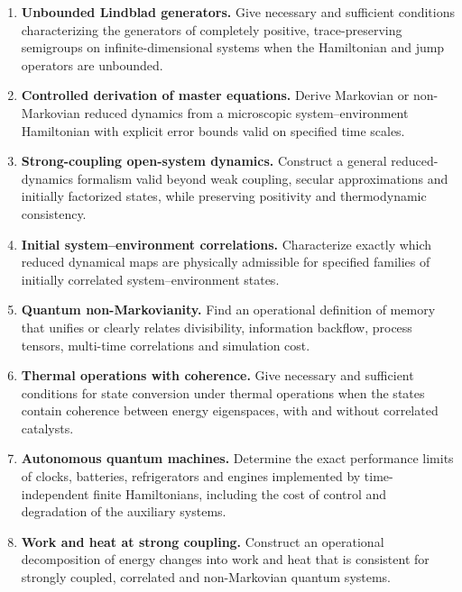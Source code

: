 \documentclass{article}
\begin{document}
\begin{enumerate}[label=\textbf{O\arabic*.},leftmargin=*]

\item \precise{} \textbf{Unbounded Lindblad generators.}
Give necessary and sufficient conditions characterizing the
generators of completely positive, trace-preserving semigroups on
infinite-dimensional systems when the Hamiltonian and jump operators
are unbounded.

\item \precise{} \textbf{Controlled derivation of master equations.}
Derive Markovian or non-Markovian reduced dynamics from a microscopic
system--environment Hamiltonian with explicit error bounds valid on
specified time scales.

\item \formalism{} \textbf{Strong-coupling open-system dynamics.}
Construct a general reduced-dynamics formalism valid beyond weak
coupling, secular approximations and initially factorized states,
while preserving positivity and thermodynamic consistency.

\item \precise{} \textbf{Initial system--environment correlations.}
Characterize exactly which reduced dynamical maps are physically
admissible for specified families of initially correlated
system--environment states.

\item \formalism{} \textbf{Quantum non-Markovianity.}
Find an operational definition of memory that unifies or clearly
relates divisibility, information backflow, process tensors,
multi-time correlations and simulation cost.

\item \precise{} \textbf{Thermal operations with coherence.}
Give necessary and sufficient conditions for state conversion under
thermal operations when the states contain coherence between energy
eigenspaces, with and without correlated catalysts.

\item \precise{} \textbf{Autonomous quantum machines.}
Determine the exact performance limits of clocks, batteries,
refrigerators and engines implemented by time-independent finite
Hamiltonians, including the cost of control and degradation of the
auxiliary systems.

\item \formalism{} \textbf{Work and heat at strong coupling.}
Construct an operational decomposition of energy changes into work and
heat that is consistent for strongly coupled, correlated and
non-Markovian quantum systems.

\end{enumerate}
\end{document}
